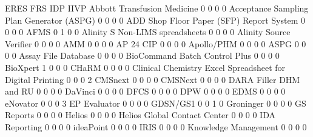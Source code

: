 \documentclass{article}
\begin{document}
\begin{Schunk}
\begin{Soutput}
                                                            ERES FRS IDP IIVP
  Abbott Transfusion Medicine                                  0   0   0    0
  Acceptance Sampling Plan Generator (ASPG)                    0   0   0    0
  ADD Shop Floor Paper (SFP) Report System                     0   0   0    0
  AFMS                                                         0   1   0    0
  Alinity S Non-LIMS spreadsheets                              0   0   0    0
  Alinity Source Verifier                                      0   0   0    0
  AMM                                                          0   0   0    0
  AP 24 CIP                                                    0   0   0    0
  Apollo/PHM                                                   0   0   0    0
  ASPG                                                         0   0   0    0
  Assay File Database                                          0   0   0    0
  BioCommand Batch Control Plus                                0   0   0    0
  BioXpert                                                     1   0   0    0
  CHaRM                                                        0   0   0    0
  Clinical Chemistry Excel Spreadsheet for Digital Printing    0   0   0    2
  CMSnext                                                      0   0   0    0
  CMSNext                                                      0   0   0    0
  DARA Filler DHM and RU                                       0   0   0    0
  DaVinci                                                      0   0   0    0
  DFCS                                                         0   0   0    0
  DPW                                                          0   0   0    0
  EDMS                                                         0   0   0    0
  eNovator                                                     0   0   0    3
  EP Evaluator                                                 0   0   0    0
  GDSN/GS1                                                     0   0   1    0
  Groninger                                                    0   0   0    0
  GS Reports                                                   0   0   0    0
  Helios                                                       0   0   0    0
  Helios Global Contact Center                                 0   0   0    0
  IDA Reporting                                                0   0   0    0
  ideaPoint                                                    0   0   0    0
  IRIS                                                         0   0   0    0
  Knowledge Management                                         0   0   0    0

\end{Soutput}
\end{Schunk}
\end{document}
